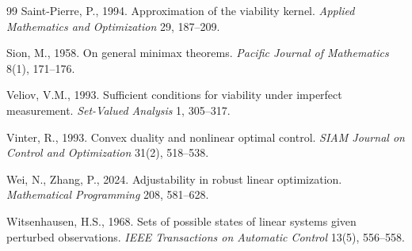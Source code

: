 \begin{thebibliography}{99}
 Saint-Pierre, P., 1994. Approximation of the viability kernel. \emph{Applied Mathematics and Optimization} 29, 187--209.

 Sion, M., 1958. On general minimax theorems. \emph{Pacific Journal of Mathematics} 8(1), 171--176.

 Veliov, V.M., 1993. Sufficient conditions for viability under imperfect measurement. \emph{Set-Valued Analysis} 1, 305--317.

 Vinter, R., 1993. Convex duality and nonlinear optimal control. \emph{SIAM Journal on Control and Optimization} 31(2), 518--538.

 Wei, N., Zhang, P., 2024. Adjustability in robust linear optimization. \emph{Mathematical Programming} 208, 581--628.

 Witsenhausen, H.S., 1968. Sets of possible states of linear systems given perturbed observations. \emph{IEEE Transactions on Automatic Control} 13(5), 556--558.

\end{thebibliography}


